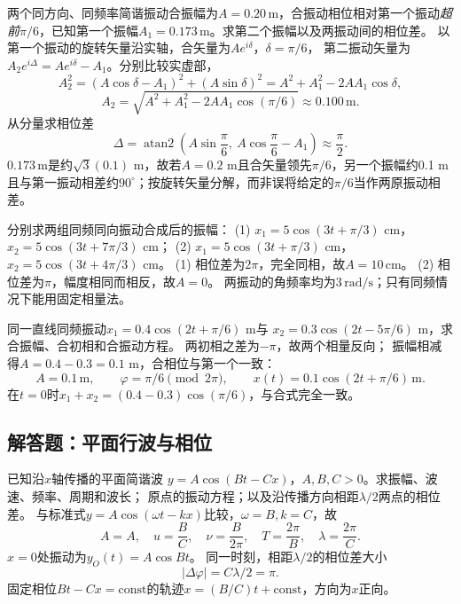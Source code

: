 \problemtext 两个同方向、同频率简谐振动合振幅为$A=0.20\,\mathrm m$，合振动相位相对第一个振动\emph{超前}$\pi/6$，已知第一个振幅$A_1=0.173\,\mathrm m$。求第二个振幅以及两振动间的相位差。
\workings
以第一个振动的旋转矢量沿实轴，合矢量为$A e^{i\delta}$，$\delta=\pi/6$，
第二振动矢量为$A_2e^{i\Delta}=Ae^{i\delta}-A_1$。分别比较实虚部，
\[
A_2^2=(A\cos\delta-A_1)^2+(A\sin\delta)^2
=A^2+A_1^2-2AA_1\cos\delta,
\]
\[
\boxed{A_2=\sqrt{A^2+A_1^2-2AA_1\cos(\pi/6)}
\approx0.100\,\mathrm m}.
\]
从分量求相位差
\[
\boxed{\Delta=\operatorname{atan2}
\left(A\sin\frac\pi6,\ A\cos\frac\pi6-A_1\right)
\approx\frac{\pi}{2}}.
\]
\crosscheck $0.173\,\mathrm m$是约$\sqrt3(0.1)$ m，故若$A=0.2$ m且合矢量领先$\pi/6$，另一个振幅约0.1 m且与第一振动相差约$90^\circ$；按旋转矢量分解，而非误将给定的$\pi/6$当作两原振动相差。

\problemtext 分别求两组同频同向振动合成后的振幅：
(1) $x_1=5\cos(3t+\pi/3)$ cm，$x_2=5\cos(3t+7\pi/3)$ cm；
(2) $x_1=5\cos(3t+\pi/3)$ cm，$x_2=5\cos(3t+4\pi/3)$ cm。
\workings
(1) 相位差为$2\pi$，完全同相，故$\boxed{A=10\,\mathrm{cm}}$。
(2) 相位差为$\pi$，幅度相同而相反，故$\boxed{A=0}$。
\crosscheck 两振动的角频率均为$3\,\mathrm{rad/s}$；只有同频情况下能用固定相量法。

\problemtext 同一直线同频振动$x_1=0.4\cos(2t+\pi/6)$ m与
$x_2=0.3\cos(2t-5\pi/6)$ m，求合振幅、合初相和合振动方程。
\workings
两初相之差为$-\pi$，故两个相量反向；
振幅相减得$A=0.4-0.3=0.1$ m，合相位与第一个一致：
\[
\boxed{A=0.1\,\mathrm m},\qquad
\boxed{\varphi=\pi/6\pmod{2\pi}},\qquad
\boxed{x(t)=0.1\cos(2t+\pi/6)\,\mathrm m}.
\]
\crosscheck 在$t=0$时$x_1+x_2=(0.4-0.3)\cos(\pi/6)$，与合式完全一致。

\subsection{解答题：平面行波与相位}

\problemtext 已知沿$x$轴传播的平面简谐波
$y=A\cos(Bt-Cx)$，$A,B,C>0$。求振幅、波速、频率、周期和波长；
原点的振动方程；以及沿传播方向相距$\lambda/2$两点的相位差。
\workings
与标准式$y=A\cos(\omega t-kx)$比较，$\omega=B,k=C$，故
\[
\boxed{A=A,\quad u=\frac BC,\quad
\nu=\frac B{2\pi},\quad T=\frac{2\pi}{B},\quad
\lambda=\frac{2\pi}{C}}.
\]
$x=0$处振动为$\boxed{y_O(t)=A\cos Bt}$。
同一时刻，相距$\lambda/2$的相位差大小
\[
\boxed{|\Delta\varphi|=C\lambda/2=\pi}.
\]
\crosscheck 固定相位$Bt-Cx=\mathrm{const}$的轨迹$x=(B/C)t+\mathrm{const}$，方向为$x$正向。

